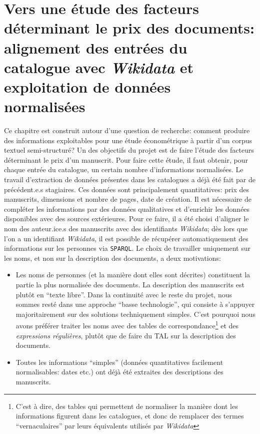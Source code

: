 \documentclass[a4paper, 12pt, twoside]{book}
\newcommand{\rgx}{\textit{expressions régulières}}
\newcommand{\sparql}{\texttt{\gls{SPARQL}}}
\newcommand{\wkd}{\textit{Wikidata}}
\begin{document}
\chapter{Vers une étude des facteurs déterminant le prix des documents: alignement des entrées du catalogue avec \wkd{} et exploitation de données normalisées}
Ce chapitre est construit autour d'une question de recherche: comment produire des informations exploitables pour une étude économétrique à partir d'un corpus textuel semi-structuré? Un des objectifs du projet est de faire l'étude des facteurs déterminant le prix d'un manuscrit. Pour faire cette étude, il faut obtenir, pour chaque entrée du catalogue, un certain nombre d'informations normalisées. Le travail d'extraction de données présentes dans les catalogues a déjà été fait par de précédent.e.s stagiaires. Ces données sont principalement quantitatives: prix des manuscrits, dimensions et nombre de pages, date de création. Il est nécessaire de compléter les informations par des données qualitatives et d'enrichir les données disponibles avec des sources extérieures. Pour ce faire, il a été choisi d'aligner le nom des auteur.ice.s des manuscrits avec des identifiants \wkd{}; dès lors que l'on a un identifiant \wkd{}, il est possible de récupérer automatiquement des informations sur les personnes via \sparql. Le choix de travailler uniquement sur les noms, et non sur la description des documents, a deux motivations:
\begin{itemize}
	\item Les noms de personnes (et la manière dont elles sont décrites) constituent la partie la plus normalisée des documents. La description des manuscrits est plutôt en \enquote{texte libre}. Dans la continuité avec le reste du projet, nous sommes resté dans une approche \enquote{basse technologie}, qui consiste à s'appuyer majoritairement sur des solutions techniquement simples. C'est pourquoi nous avons préférer traiter les noms avec des tables de correspondance\footnote{C'est à dire, des tables qui permettent de normaliser la manière dont les informations figurent dans les catalogues, et donc de remplacer des termes \enquote{vernaculaires} par leurs équivalents utilisés par \wkd{}} et des \rgx{}, plutôt que de faire du TAL sur la description des documents.
	\item Toutes les informations \enquote{simples} (données quantitatives facilement normalisables: dates etc.) ont déjà été extraites des descriptions des manuscrits.
\end{itemize}
\end{document}

